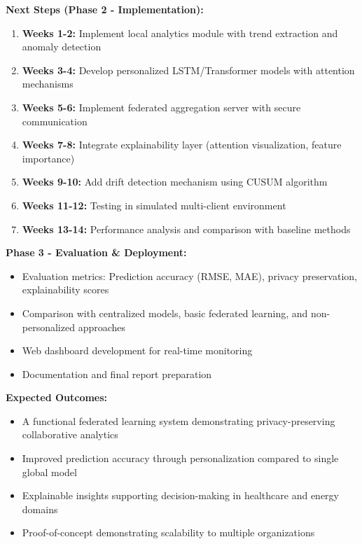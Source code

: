 \documentclass[11pt, a4paper]{article}
\begin{document}
\textbf{Next Steps (Phase 2 - Implementation):}
\begin{enumerate}[noitemsep, topsep=0pt]
    \item \textbf{Weeks 1-2:} Implement local analytics module with trend extraction and anomaly detection
    \item \textbf{Weeks 3-4:} Develop personalized LSTM/Transformer models with attention mechanisms
    \item \textbf{Weeks 5-6:} Implement federated aggregation server with secure communication
    \item \textbf{Weeks 7-8:} Integrate explainability layer (attention visualization, feature importance)
    \item \textbf{Weeks 9-10:} Add drift detection mechanism using CUSUM algorithm
    \item \textbf{Weeks 11-12:} Testing in simulated multi-client environment
    \item \textbf{Weeks 13-14:} Performance analysis and comparison with baseline methods
\end{enumerate}

\textbf{Phase 3 - Evaluation \& Deployment:}
\begin{itemize}[noitemsep, topsep=0pt]
    \item Evaluation metrics: Prediction accuracy (RMSE, MAE), privacy preservation, explainability scores
    \item Comparison with centralized models, basic federated learning, and non-personalized approaches
    \item Web dashboard development for real-time monitoring
    \item Documentation and final report preparation
\end{itemize}

\textbf{Expected Outcomes:}
\begin{itemize}[noitemsep, topsep=0pt]
    \item A functional federated learning system demonstrating privacy-preserving collaborative analytics
    \item Improved prediction accuracy through personalization compared to single global model
    \item Explainable insights supporting decision-making in healthcare and energy domains
    \item Proof-of-concept demonstrating scalability to multiple organizations
\end{itemize}
\end{document}
